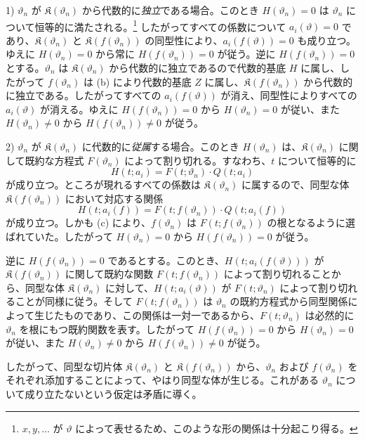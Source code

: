 1) $\vartheta_n$ が $\mathfrak K(\vartheta_n)$ から代数的に\emph{独立}である場合。このとき $H(\vartheta_n)=0$ は $\vartheta_n$ について恒等的に満たされる。\footnote{$x,y,\ldots$ が $\vartheta$ によって表せるため、このような形の関係は十分起こり得る。} したがってすべての係数について $a_i(\vartheta)=0$ であり、$\mathfrak K(\vartheta_n)$ と $\mathfrak K(f(\vartheta_n))$ の同型性により、$a_i(f(\vartheta))=0$ も成り立つ。ゆえに $H(\vartheta_n)=0$ から常に $H(f(\vartheta_n))=0$ が従う。逆に $H(f(\vartheta_n))=0$ とする。$\vartheta_n$ は $\mathfrak K(\vartheta_n)$ から代数的に独立であるので代数的基底 $H$ に属し、したがって $f(\vartheta_n)$ は (b) により代数的基底 $Z$ に属し、$\mathfrak K(f(\vartheta_n))$ から代数的に独立である。したがってすべての $a_i(f(\vartheta))$ が消え、同型性によりすべての $a_i(\vartheta)$ が消える。ゆえに $H(f(\vartheta_n))=0$ から $H(\vartheta_n)=0$ が従い、また $H(\vartheta_n)\ne0$ から $H(f(\vartheta_n))\ne0$ が従う。

2) $\vartheta_n$ が $\mathfrak K(\vartheta_n)$ に代数的に\emph{従属}する場合。このとき $H(\vartheta_n)$ は、$\mathfrak K(\vartheta_n)$ に関して既約な方程式 $F(\vartheta_n)$ によって割り切れる。すなわち、$t$ について恒等的に
\[
H(t;a_i)=F(t;\vartheta_n)\cdot Q(t;a_i)
\]
が成り立つ。ところが現れるすべての係数は $\mathfrak K(\vartheta_n)$ に属するので、同型な体 $\mathfrak K(f(\vartheta_n))$ において対応する関係
\[
H(t;a_i(f))=F(t;f(\vartheta_n))\cdot Q(t;a_i(f))
\]
が成り立つ。しかも (c) により、$f(\vartheta_n)$ は $F(t;f(\vartheta_n))$ の根となるように選ばれていた。したがって $H(\vartheta_n)=0$ から $H(f(\vartheta_n))=0$ が従う。

逆に $H(f(\vartheta_n))=0$ であるとする。このとき、$H(t;a_i(f(\vartheta)))$ が $\mathfrak K(f(\vartheta_n))$ に関して既約な関数 $F(t;f(\vartheta_n))$ によって割り切れることから、同型な体 $\mathfrak K(\vartheta_n)$ に対して、$H(t;a_i(\vartheta))$ が $F(t;\vartheta_n)$ によって割り切れることが同様に従う。そして $F(t;f(\vartheta_n))$ は $\vartheta_n$ の既約方程式から同型関係によって生じたものであり、この関係は一対一であるから、$F(t;\vartheta_n)$ は必然的に $\vartheta_n$ を根にもつ既約関数を表す。したがって $H(f(\vartheta_n))=0$ から $H(\vartheta_n)=0$ が従い、また $H(\vartheta_n)\ne0$ から $H(f(\vartheta_n))\ne0$ が従う。

したがって、同型な切片体 $\mathfrak K(\vartheta_n)$ と $\mathfrak K(f(\vartheta_n))$ から、$\vartheta_n$ および $f(\vartheta_n)$ をそれぞれ添加することによって、やはり同型な体が生じる。これがある $\vartheta_n$ について成り立たないという仮定は矛盾に導く。

